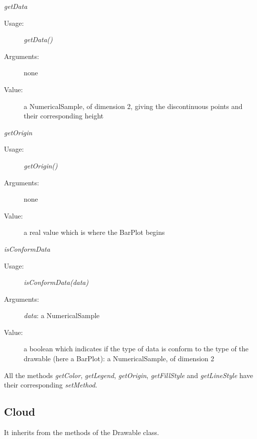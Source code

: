 \begin{description}
\begin{description}
  \item \textit{getData}
    \begin{description}
    \item[Usage:] \textit{getData()}
    \item[Arguments:] none
    \item[Value:] a NumericalSample, of dimension 2, giving the discontinuous points and their corresponding height
    \end{description}
    \bigskip
  \item \textit{getOrigin}
    \begin{description}
    \item[Usage:] \textit{getOrigin()}
    \item[Arguments:] none
    \item[Value:] a real value which is where the BarPlot begins
    \end{description}
    \bigskip
  \item \textit{isConformData}
    \begin{description}
    \item[Usage:] \textit{isConformData(data)}
    \item[Arguments:] \textit{data}: a NumericalSample
    \item[Value:] a boolean which indicates if the type of data is conform to the type of the drawable (here a BarPlot): a NumericalSample, of dimension 2
    \end{description}
  \end{description}

  All the methods \textit{getColor},  \textit{getLegend}, \textit{getOrigin}, \textit{getFillStyle}  and \textit{getLineStyle} have their corresponding \textit{setMethod}.

\end{description}



\newpage
\subsection{Cloud}


It inherits from the methods of the Drawable class.

